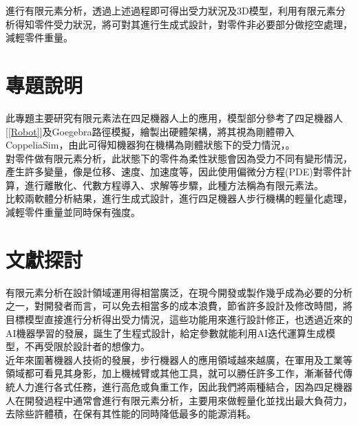 進行有限元素分析，透過上述過程即可得出受力狀況及3D模型，利用有限元素分析得知零件受力狀況，將可對其進行生成式設計，對零件非必要部分做挖空處理，減輕零件重量。\
\newpage
\section{專題說明}
此專題主要研究有限元素法在四足機器人上的應用，模型部分參考了四足機器人[\ref{Robot}]及Goegebra路徑模擬，繪製出硬體架構，將其視為剛體帶入CoppeliaSim，由此可得知機器狗在機構為剛體狀態下的受力情況，。\\

對零件做有限元素分析，此狀態下的零件為柔性狀態會因為受力不同有變形情況，產生許多變量，像是位移、速度、加速度等，因此使用偏微分方程(PDE)對零件計算，進行離散化、代數方程導入、求解等步驟，此種方法稱為有限元素法。\\

比較兩軟體分析結果，進行生成式設計，進行四足機器人步行機構的輕量化處理，減輕零件重量並同時保有強度。\\

\section{文獻探討}

有限元素分析在設計領域運用得相當廣泛，在現今開發或製作幾乎成為必要的分析之一，對開發者而言，可以免去相當多的成本浪費，節省許多設計及修改時間，將目標模型直接進行分析得出受力情況，這些功能用來進行設計修正，也透過近來的AI機器學習的發展，誕生了生程式設計，給定參數就能利用AI迭代運算生成模型，不再受限於設計者的想像力。\\

近年來圍著機器人技術的發展，步行機器人的應用領域越來越廣，在軍用及工業等領域都可看見其身影，加上機械臂或其他工具，就可以勝任許多工作，漸漸替代傳統人力進行各式任務，進行高危或負重工作，因此我們將兩種結合，因為四足機器人在開發過程中通常會進行有限元素分析，主要用來做輕量化並找出最大負荷力，去除些許體積，在保有其性能的同時降低最多的能源消耗。\
\newpage

\renewcommand{\baselinestretch}{0.5} %

